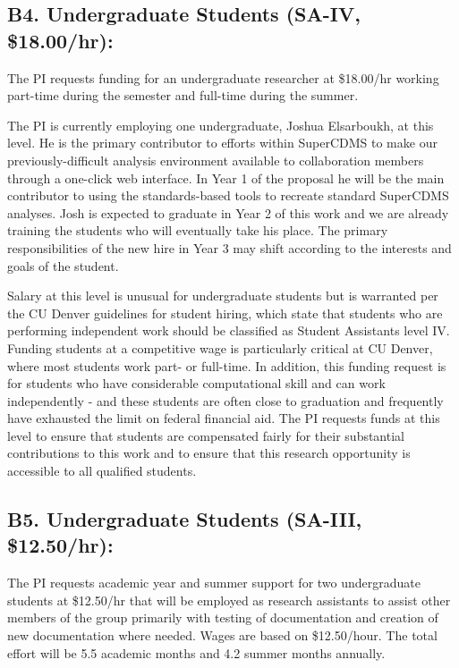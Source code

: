 \documentclass[11pt,oneside]{memoir}
\begin{document}
\subsection{B4. Undergraduate Students (SA-IV, \$18.00/hr):}

The PI requests funding for an undergraduate researcher at \$18.00/hr working part-time during the semester and full-time during the summer.  

The PI is currently employing one undergraduate, Joshua Elsarboukh, at this level. He is the primary contributor to efforts within SuperCDMS to make our previously-difficult analysis environment available to collaboration members through a one-click web interface.  In Year 1 of the proposal he will be the main contributor to using the standards-based tools to recreate standard SuperCDMS analyses.  Josh is expected to graduate in Year 2 of this work and we are already training the students who will eventually take his place.  The primary responsibilities of the new hire in Year 3 may shift according to the interests and goals of the student.

Salary at this level is unusual for undergraduate students but is warranted per the CU Denver guidelines for student hiring, which state that students who are performing independent work should be classified as Student Assistants level IV.  Funding students at a competitive wage is particularly critical at CU Denver, where most students work part- or full-time.  In addition, this funding request is for students who have considerable computational skill and can work independently - and these students are often close to graduation and frequently have exhausted the limit on federal financial aid.  The PI requests funds at this level to ensure that students are compensated fairly for their substantial contributions to this work and to ensure that this research opportunity is accessible to all qualified students. 

\subsection{B5. Undergraduate Students (SA-III, \$12.50/hr):}

The PI requests academic year and summer support for two undergraduate students at \$12.50/hr that will be employed as research assistants to assist other members of the group primarily with testing of documentation and creation of new documentation where needed.  Wages are based on \$12.50/hour. The total effort will be 5.5 academic months and 4.2 summer months annually.
\end{document}
